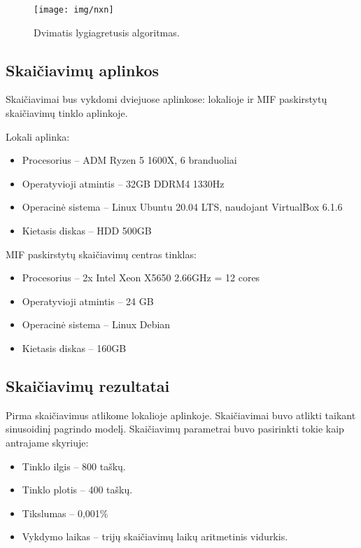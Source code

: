 \documentclass{VUMIFPSkursinis}
\begin{document}
\begin{figure}[H]
\centering
\texttt{[image: img/nxn]}
\caption{Dvimatis lygiagretusis algoritmas.} %
\label{img:text}
\end{figure}

\subsection{Skaičiavimų aplinkos}
Skaičiavimai bus vykdomi dviejuose aplinkose: lokalioje ir MIF paskirstytų skaičiavimų tinklo aplinkoje.


Lokali aplinka:
\begin{itemize}
\item{Procesorius – ADM Ryzen 5 1600X, 6 branduoliai}
\item{Operatyvioji atmintis – 32GB DDRM4 1330Hz}
\item{Operacinė sistema – Linux Ubuntu 20.04 LTS, naudojant VirtualBox 6.1.6}
\item{Kietasis diskas – HDD 500GB}
\end{itemize}


MIF paskirstytų skaičiavimų centras tinklas:
\begin{itemize}
\item{Procesorius – 2x Intel Xeon X5650 2.66GHz = 12 cores}
\item{Operatyvioji atmintis – 24 GB}
\item{Operacinė sistema – Linux Debian}
\item{Kietasis diskas – 160GB}
\end{itemize}

\subsection{Skaičiavimų rezultatai}
Pirma skaičiavimus atlikome lokalioje aplinkoje.
Skaičiavimai buvo atlikti taikant sinusoidinį pagrindo modelį.
Skaičiavimų parametrai buvo pasirinkti tokie kaip antrajame skyriuje:
\begin{itemize}
\item{Tinklo ilgis – 800 taškų.}
\item{Tinklo plotis – 400 taškų.}
\item{Tikslumas – 0,001\%}
\item{Vykdymo laikas – trijų skaičiavimų laikų aritmetinis vidurkis.}
\end{itemize} 
\end{document}
